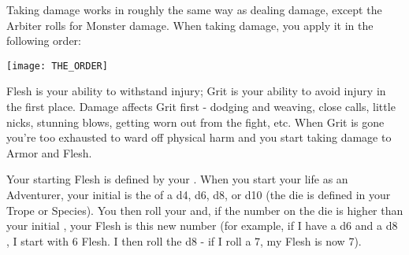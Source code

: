 {  

  Taking damage works in roughly the same way as dealing damage, except the Arbiter rolls for Monster damage.    When taking damage, you apply it in the following order:

  \begin{center}
  \texttt{[image: THE\_ORDER]}
  \end{center}






Flesh is your ability to withstand injury; Grit is your ability to avoid injury in the first place.  Damage affects Grit first - dodging and weaving, close calls, little nicks, stunning blows, getting worn out from the fight, etc. When Grit is gone you're too exhausted to ward off physical harm and you start taking damage to Armor and Flesh.

Your starting Flesh is defined by your \FLESH.  When you start your life as an Adventurer, your initial \FLESH is the \MAX of a d4, d6, d8, or d10 (the die is defined in your Trope or Species). You then roll your \VIG and, if the number on the die is higher than your initial \FLESH, your \MAX Flesh is this new number (for example, if I have a d6 \FLESH and a d8 \VIG, I start with 6 Flesh.  I then roll the d8 - if I roll a 7, my \MAX Flesh is now 7).

}
